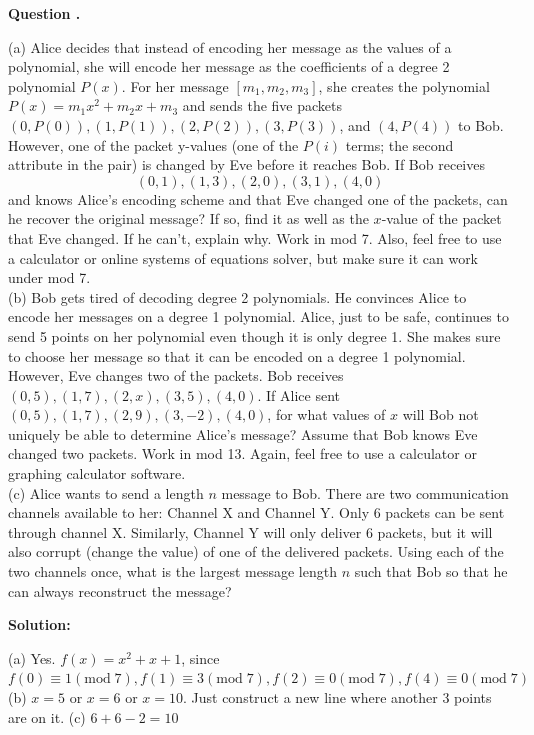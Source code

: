\documentclass[12pt]{article}
\newcounter{questionnumber}
\newenvironment{question}[1][]{\stepcounter{questionnumber}\par\noindent\textbf{Question \thequestionnumber. #1}\par}{\par}
\newenvironment{solution}{\par\noindent\textbf{Solution:}\par}{\par\vspace{1em}}
\begin{document}
\begin{question}
    \noindent
    (a) Alice decides that instead of encoding her message as the values of a polynomial, she will encode her message as the coefficients of a degree 2 polynomial $P(x).$ For her message $[m_1,m_2,m_3]$, she creates the polynomial $P(x)=m_1x^2+m_2x+m_3$ and sends the five packets $(0,P(0)),(1,P(1)),(2,P(2)),(3,P(3))$, and $(4,P(4))$ to Bob. However, one of the packet y-values (one of the $P(i)$ terms; the second attribute in the pair) is changed by Eve before it reaches Bob. If Bob receives
    $$(0,1),(1,3),(2,0),(3,1),(4,0)$$
    and knows Alice's encoding scheme and that Eve changed one of the packets, can he recover the original message? If so, find it as well as the $x$-value of the packet that Eve changed. If he can't, explain why. Work in mod 7. Also, feel free to use a calculator or online systems of equations solver, but make sure it can work under mod 7.\\
    (b) Bob gets tired of decoding degree 2 polynomials. He convinces Alice to encode her messages
    on a degree 1 polynomial. Alice, just to be safe, continues to send 5 points on her polynomial even though it is only degree 1. She makes sure to choose her message so that it can be encoded on a degree 1 polynomial. However, Eve changes two of the packets. Bob receives $(0,5),(1,7),(2,x),(3,5),(4,0).$ If Alice sent $(0,5),(1,7),(2,9),(3,-2),(4,0)$, for what values of $x$ will Bob not uniquely be able to determine Alice's message? Assume that Bob knows Eve changed two packets. Work in mod 13. Again, feel free to use a calculator or graphing calculator software.\\
    (c) Alice wants to send a length $n$ message to Bob. There are two communication channels available to her: Channel X and Channel Y. Only 6 packets can be sent through channel X. Similarly, Channel Y will only deliver 6 packets, but it will also corrupt (change the value) of one of the delivered packets. Using each of the two channels once, what is the largest message length $n$ such that Bob so that he can always reconstruct the message?
\end{question}
\begin{solution}
    \noindent
    (a) Yes. $f(x)=x^2+x+1$, since $f\left( 0 \right) \equiv 1\left( \mathrm{mod}\;7 \right) , f\left( 1 \right) \equiv 3\left( \mathrm{mod}\;7 \right) , f\left( 2 \right) \equiv 0\left( \mathrm{mod}\;7 \right) , f\left( 4 \right) \equiv 0\left( \mathrm{mod}\;7 \right)$\\
    (b) $x=5$ or $x=6$ or $x=10$. Just construct a new line where another 3 points are on it.
    (c) $6+6-2=10$
\end{solution}
\end{document}
